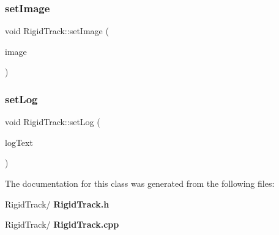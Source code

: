 \mbox{\label{class_rigid_track_a3b0b3835204cad40abdb144d24aefc76}} 
\subsubsection{set\+Image}
{\footnotesize\ttfamily void Rigid\+Track\+::set\+Image (\begin{DoxyParamCaption}\item[{Q\+Pixmap}]{image }\end{DoxyParamCaption})\hspace{0.3cm}{\ttfamily [slot]}}

\mbox{\label{class_rigid_track_a54a029af74a21f92749e99df7ed847b2}} 
\subsubsection{set\+Log}
{\footnotesize\ttfamily void Rigid\+Track\+::set\+Log (\begin{DoxyParamCaption}\item[{Q\+String}]{log\+Text }\end{DoxyParamCaption})\hspace{0.3cm}{\ttfamily [slot]}}



The documentation for this class was generated from the following files\+:\begin{DoxyCompactItemize}
\item 
Rigid\+Track/\textbf{ Rigid\+Track.\+h}\item 
Rigid\+Track/\textbf{ Rigid\+Track.\+cpp}\end{DoxyCompactItemize}
